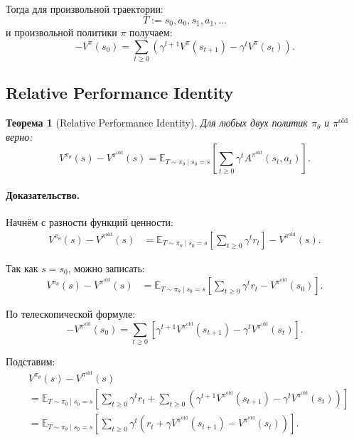 \documentclass[12pt,a4paper]{article}
\newtheorem{theorem}{Теорема}
\begin{document}
Тогда для произвольной траектории:
\[
T := s_0,a_0,s_1,a_1,\ldots
\]
и произвольной политики $\pi$ получаем:
\[
-
V^\pi(s_0)
=
\sum_{t\ge 0}
\left(
\gamma^{t+1}V^\pi(s_{t+1})
-
\gamma^t V^\pi(s_t)
\right).
\]

\subsection{Relative Performance Identity}

\begin{theorem}[Relative Performance Identity]
Для любых двух политик $\pi_\theta$ и $\pi^{\mathrm{old}}$ верно:
\[
V^{\pi_\theta}(s)
-
V^{\pi^{\mathrm{old}}}(s)
=
\mathbb E_{T\sim\pi_\theta\mid s_0=s}
\left[
\sum_{t\ge 0}
\gamma^t
A^{\pi^{\mathrm{old}}}(s_t,a_t)
\right].
\]
\end{theorem}

\paragraph{Доказательство.}

Начнём с разности функций ценности:
\[
\begin{aligned}
V^{\pi_\theta}(s)
-
V^{\pi^{\mathrm{old}}}(s)
&=
\mathbb E_{T\sim\pi_\theta\mid s_0=s}
\left[
\sum_{t\ge 0}
\gamma^t r_t
\right]
-
V^{\pi^{\mathrm{old}}}(s).
\end{aligned}
\]

Так как $s=s_0$, можно записать:
\[
\begin{aligned}
V^{\pi_\theta}(s)
-
V^{\pi^{\mathrm{old}}}(s)
&=
\mathbb E_{T\sim\pi_\theta\mid s_0=s}
\left[
\sum_{t\ge 0}
\gamma^t r_t
-
V^{\pi^{\mathrm{old}}}(s_0)
\right].
\end{aligned}
\]

По телескопической формуле:
\[
-
V^{\pi^{\mathrm{old}}}(s_0)
=
\sum_{t\ge 0}
\left[
\gamma^{t+1}V^{\pi^{\mathrm{old}}}(s_{t+1})
-
\gamma^t V^{\pi^{\mathrm{old}}}(s_t)
\right].
\]

Подставим:
\[
\begin{aligned}
&
V^{\pi_\theta}(s)
-
V^{\pi^{\mathrm{old}}}(s)
\\
&=
\mathbb E_{T\sim\pi_\theta\mid s_0=s}
\left[
\sum_{t\ge 0}
\gamma^t r_t
+
\sum_{t\ge 0}
\left(
\gamma^{t+1}V^{\pi^{\mathrm{old}}}(s_{t+1})
-
\gamma^t V^{\pi^{\mathrm{old}}}(s_t)
\right)
\right]
\\
&=
\mathbb E_{T\sim\pi_\theta\mid s_0=s}
\left[
\sum_{t\ge 0}
\gamma^t
\left(
r_t
+
\gamma V^{\pi^{\mathrm{old}}}(s_{t+1})
-
V^{\pi^{\mathrm{old}}}(s_t)
\right)
\right].
\end{aligned}
\]
\end{document}
